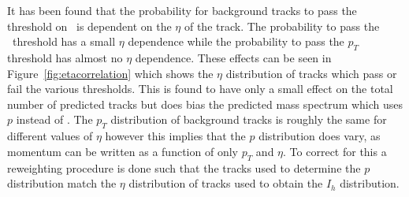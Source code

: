 It has been found that the probability for background tracks to pass the threshold on \ias\ is dependent on the $\eta$ of the track.
The probability to pass the \invbeta\ threshold has a small $\eta$
dependence while the probability to pass the $p_T$ threshold has almost no $\eta$ dependence. These effects can be seen in Figure~\ref{fig:etacorrelation} which shows the $\eta$
distribution of tracks which
pass or fail the various thresholds. 
This is found to have only a small effect on the total number of predicted tracks but does bias the predicted mass spectrum which uses $p$ instead of \pt.
The $p_T$ distribution of background tracks is roughly the same for different values of $\eta$ 
however this implies that the $p$ distribution does vary, as momentum can be written
as a function of only $p_T$ and $\eta$. To correct for this a reweighting procedure is done such that the tracks
used to determine the $p$ distribution match the $\eta$ distribution of tracks used to obtain the $I_h$ distribution.

